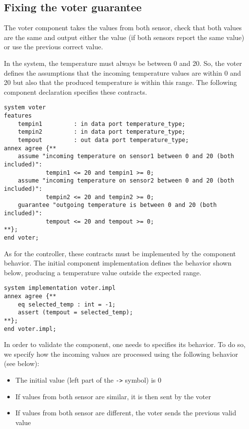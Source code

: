 \documentclass[times, 10pt]{article}
\begin{document}
    \subsection{Fixing the voter guarantee}
    The voter component takes the values from both sensor, check that both
    values are the same and output either the value (if both sensors report the
    same value) or use the previous correct value.

    In the system, the temperature must always be between 0 and 20. So, the
    voter defines the assumptions that the incoming temperature values are
    within 0 and 20 but also that the produced temperature is within this range.
    The following component declaration specifies these contracts.

\begin{lstlisting}
system voter
features
	tempin1 		: in data port temperature_type;
	tempin2 		: in data port temperature_type;
	tempout 		: out data port temperature_type;
annex agree {**
    assume "incoming temperature on sensor1 between 0 and 20 (both included)": 
            tempin1 <= 20 and tempin1 >= 0;
    assume "incoming temperature on sensor2 between 0 and 20 (both included)": 
            tempin2 <= 20 and tempin2 >= 0;
    guarantee "outgoing temperature is between 0 and 20 (both included)": 
            tempout <= 20 and tempout >= 0;
**}; 
end voter;
\end{lstlisting}

    As for the controller, these contracts must be implemented
    by the component behavior. The initial component implementation defines the
    behavior shown below, producing a temperature value outside the expected
    range.

\begin{lstlisting}
system implementation voter.impl
annex agree {**
	eq selected_temp : int = -1;
    assert (tempout = selected_temp);
**}; 
end voter.impl;

\end{lstlisting}

    In order to validate the component, one needs to specifies its behavior. To
    do so, we specify how the incoming values are processed using the following
    behavior (see below):
    \begin{itemize}
        \item
            The initial value (left part of the \texttt{->} symbol) is 0
         \item
            If values from both sensor are similar, it is then sent by the voter
         \item
            If values from both sensor are different, the voter sends the
            previous valid value
    \end{itemize}
\end{document}
